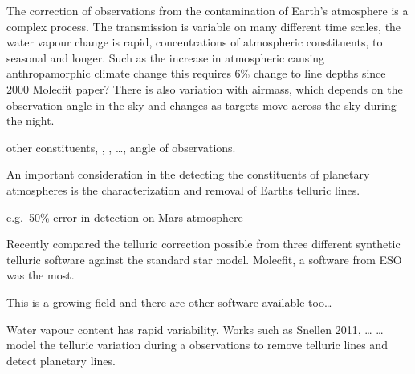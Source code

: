 The correction of observations from the contamination of Earth's atmosphere is a complex process. The transmission is variable on many different time scales, the water vapour change is rapid, concentrations of atmospheric constituents, to seasonal and longer. Such as the increase in atmospheric  causing anthropamorphic climate change this requires 6\% change to  line depths since 2000 Molecfit paper? There is also variation with airmass, which depends on the observation angle in the sky and changes as targets move across the sky during the night.

other constituents, , ,  \ldots{}, angle of observations.

An important consideration in the detecting the constituents of planetary atmospheres is the characterization and removal of Earths telluric lines.

e.g.\ 50\% error in  detection on Mars atmosphere


Recently \citet{ulmer-moll_telluric_2018} compared the telluric correction possible from three different synthetic telluric software against the standard star model. Molecfit, a software from ESO was the most.

This is a growing field and there are other software available too\ldots{}


Water vapour content has rapid variability. Works such as Snellen 2011, \ldots{} \ldots{}  model the telluric variation during a observations to remove telluric lines and detect planetary lines.




